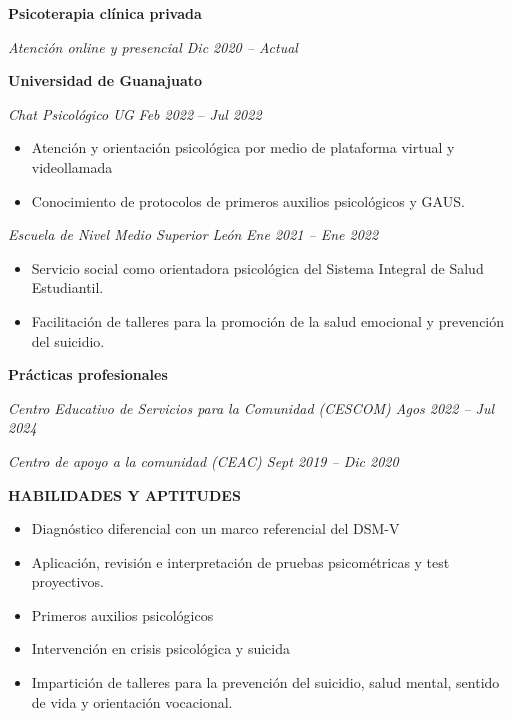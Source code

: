 \textbf{Psicoterapia clínica privada}

\emph{Atención online y presencial \textbar{} Dic 2020 -- Actual}

\textbf{Universidad de Guanajuato}

\emph{Chat Psicológico UG} \textbf{\textbar{}} \emph{Feb 2022} --
\emph{Jul 2022}

\begin{itemize}
\item
  Atención y orientación psicológica por medio de plataforma virtual y
  videollamada
\item
  Conocimiento de protocolos de primeros auxilios psicológicos y GAUS.
\end{itemize}

\emph{Escuela de Nivel Medio Superior León} \textbar{} \emph{Ene 2021 --
Ene 2022}

\begin{itemize}
\item
  Servicio social como orientadora psicológica del Sistema Integral de
  Salud Estudiantil.
\item
  Facilitación de talleres para la promoción de la salud emocional y
  prevención del suicidio.
\end{itemize}

\textbf{Prácticas profesionales}

\emph{Centro Educativo de Servicios para la Comunidad (CESCOM)
\textbar{} Agos 2022 -- Jul 2024}

\emph{Centro de apoyo a la comunidad (CEAC) \textbar{} Sept 2019 -- Dic
2020}

\textbf{HABILIDADES Y APTITUDES}

\begin{itemize}
\item
  Diagnóstico diferencial con un marco referencial del DSM-V
\item
  Aplicación, revisión e interpretación de pruebas psicométricas y test
  proyectivos.
\item
  Primeros auxilios psicológicos
\item
  Intervención en crisis psicológica y suicida
\item
  Impartición de talleres para la prevención del suicidio, salud mental,
  sentido de vida y orientación vocacional.
\end{itemize}
